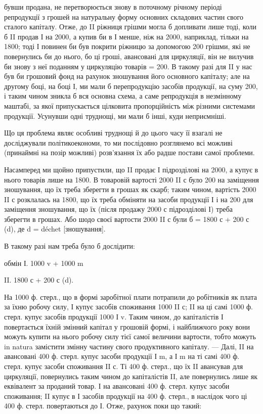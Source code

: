\parcont{}  %
бувши продана, не перетворюється знову в поточному річному періоді
репродукції з грошей на натуральну форму основних складових частин
свого сталого капіталу. Отже, до II ріжниця грішми могла б допливати
лише тоді, коли б II продав І на 2000, а купив би в І менше, ніж на
2000, наприклад, тільки на 1800; тоді І повинен би був покрити
ріжницю за допомогою 200 грішми, які не повернулись би до нього, бо
ці гроші, авансовані для циркуляції, він не вилучив би знову з неї поданням
у циркуляцію товарів = 200. В такому разі для II у нас був би
грошовий фонд на рахунок зношування його основного капіталу; але на
другому боці, на боці І, ми мали б перепродукцію засобів продукції, на
суму 200, і таким чином зникла б вся основна схема, а саме репродукція
в незмінному маштабі, за якої припускається цілковита пропорційність
між різними системами продукції. Усунувши одні труднощі, ми мали б
інші, куди неприємніші.

Що ця проблема являє особливі труднощі й до цього часу її взагалі
не досліджували політикоекономи, то ми послідовно розглянемо всі можливі
(принаймні на позір можливі) розв'язання їх або радше постави
самої проблеми.

Насамперед ми щойно припустили, що II продає І підрозділові на
2000, а купує в нього товарів лише на 1800. В товаровій вартості
2000 II с було 200 на заміщення зношування, що їх треба зберегти
в грошах як скарб; таким чином, вартість 2000 II с розклалась на
1800, що їх треба обміняти на засоби продукції І і на 200 для заміщення
зношування, що їх (після продажу 2000 с підрозділові І) треба
зберегти в грошах. Або шодо своєї вартости 2000 II с були б = 1800 с +
200 с (d), де d = déchet [зношування].

В такому разі нам треба було б дослідити:

обмін І. 1000 v + 1000 m

II.    1800 с + 200 с (d).

На 1000 ф. стерл., що в формі заробітної плати потрапили до робітників
як плата за їхню робочу силу, І купує засобів споживання
1000 II с; II на ці самі 1000 ф. стерл. купує засобів продукції 1000 І v.
Таким чином, до капіталістів І повертається їхній змінний капітал у
грошовій формі, і найближчого року вони можуть купити на нього робочу
силу тієї самої величини вартости, тобто можуть in natura замістити
змінну частину свого продуктивного капіталу. — Далі, II на авансовані
400 ф. стерл. купує засоби продукції І m, а І m на ті самі
400 ф. стерл. купує засоби споживання II с. Ті 400 ф. стерл., що їх II
авансував для циркуляції, повернулись таким чином до капіталістів II, але
повернулись лише як еквівалент за проданий товар. І на авансовані
400 ф. стерл. купує засоби споживання; II купує в І засобів продукції
на 400 ф. стерл., в наслідок чого ці 400 ф. стерл. повертаються до І.
Отже, рахунок поки що такий:
\parbreak{}  %
